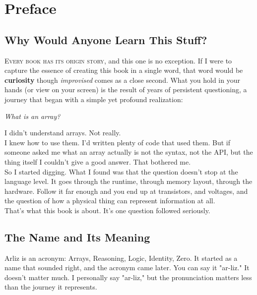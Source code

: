 \chapter{Preface}

\section*{Why Would Anyone Learn This Stuff?}

\lettrine{E}{very book has its origin story}, and this one is no exception. If I were to capture the essence of creating this book in a single word, that word would be \textbf{curiosity} though \emph{improvised} comes as a close second. What you hold in your hands (or view on your screen) is the result of years of persistent questioning, a journey that began with a simple yet profound realization: 

\begin{center}
    \emph{What is an array?}
\end{center}
I didn't understand arrays. Not really.\\
I knew how to use them. I'd written plenty of code that used them. But if someone asked me what an array actually is not the syntax, not the API, but the thing itself I couldn't give a good answer. That bothered me.\\
So I started digging. What I found was that the question doesn't stop at the language level. It goes through the runtime, through memory layout, through the hardware. Follow it far enough and you end up at transistors, and voltages, and the question of how a physical thing can represent information at all.\\
That's what this book is about. It's one question followed seriously.
\section*{The Name and Its Meaning}
Arliz is an acronym: Arrays, Reasoning, Logic, Identity, Zero. It started as a name that sounded right, and the acronym came later. You can say it "ar-liz." It doesn't matter much. I personally say "ar-liz," but the pronunciation matters less than the journey it represents.

